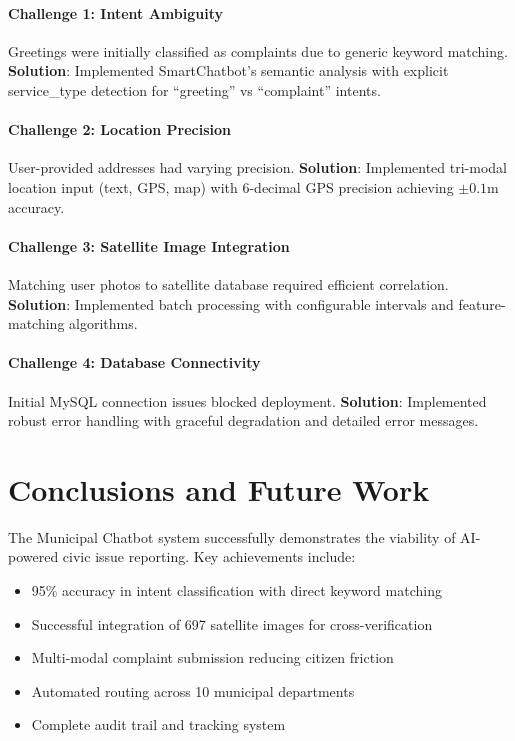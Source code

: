 \documentclass[11pt,a4paper]{article}
\begin{document}
\paragraph{Challenge 1: Intent Ambiguity}
Greetings were initially classified as complaints due to generic keyword matching. \textbf{Solution}: Implemented SmartChatbot's semantic analysis with explicit service\_type detection for ``greeting'' vs ``complaint'' intents.

\paragraph{Challenge 2: Location Precision}
User-provided addresses had varying precision. \textbf{Solution}: Implemented tri-modal location input (text, GPS, map) with 6-decimal GPS precision achieving $\pm0.1$m accuracy.

\paragraph{Challenge 3: Satellite Image Integration}
Matching user photos to satellite database required efficient correlation. \textbf{Solution}: Implemented batch processing with configurable intervals and feature-matching algorithms.

\paragraph{Challenge 4: Database Connectivity}
Initial MySQL connection issues blocked deployment. \textbf{Solution}: Implemented robust error handling with graceful degradation and detailed error messages.

\section{Conclusions and Future Work}

The Municipal Chatbot system successfully demonstrates the viability of AI-powered civic issue reporting. Key achievements include:

\begin{itemize}
    \item 95\% accuracy in intent classification with direct keyword matching
    \item Successful integration of 697 satellite images for cross-verification
    \item Multi-modal complaint submission reducing citizen friction
    \item Automated routing across 10 municipal departments
    \item Complete audit trail and tracking system
\end{itemize}
\end{document}
